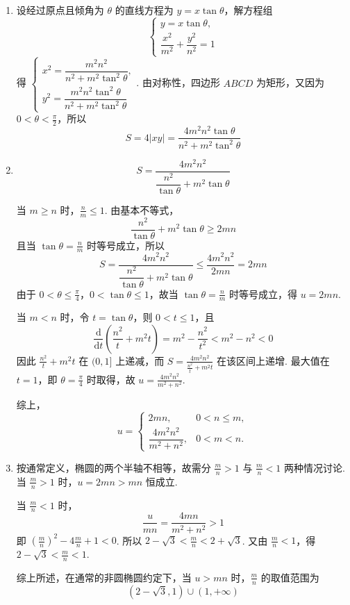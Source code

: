 \begin{solution}
\begin{enumerate}
\item 设经过原点且倾角为 \(\theta\) 的直线方程为 \(y=x\tan\theta\)，解方程组
\[
\begin{cases}
y=x\tan\theta,\\
\dfrac{x^2}{m^2}+\dfrac{y^2}{n^2}=1
\end{cases}
\]
得 \(\begin{cases}
x^2=\dfrac{m^2n^2}{n^2+m^2\tan^2\theta},\\
y^2=\dfrac{m^2n^2\tan^2\theta}{n^2+m^2\tan^2\theta}
\end{cases}\).
由对称性，四边形 \(ABCD\) 为矩形，又因为 \(0<\theta<\frac{\pi}{2}\)，所以
\[
S=4|xy|=\frac{4m^2n^2\tan\theta}{n^2+m^2\tan^2\theta}
\]

\item
\[
S=\frac{4m^2n^2}{\dfrac{n^2}{\tan\theta}+m^2\tan\theta}
\]

当 \(m\geqslant n\) 时，\(\frac{n}{m}\leqslant1\). 由基本不等式，
\[
\frac{n^2}{\tan\theta}+m^2\tan\theta\geqslant2mn
\]
且当 \(\tan\theta=\frac{n}{m}\) 时等号成立，所以
\[
S=\frac{4m^2n^2}{\dfrac{n^2}{\tan\theta}+m^2\tan\theta}\leqslant\frac{4m^2n^2}{2mn}=2mn
\]
由于 \(0<\theta\leqslant\frac{\pi}{4}\)，\(0<\tan\theta\leqslant1\)，故当 \(\tan\theta=\frac{n}{m}\) 时等号成立，得 \(u=2mn\).

当 \(m<n\) 时，令 \(t=\tan\theta\)，则 \(0<t\leqslant1\)，且
\[
\frac{\mathrm d}{\mathrm dt}\left(\frac{n^2}{t}+m^2t\right)=m^2-\frac{n^2}{t^2}<m^2-n^2<0
\]
因此 \(\frac{n^2}{t}+m^2t\) 在 \((0,1]\) 上递减，而 \(S=\frac{4m^2n^2}{\frac{n^2}{t}+m^2t}\) 在该区间上递增. 最大值在 \(t=1\)，即 \(\theta=\frac\pi4\) 时取得，故 \(u=\frac{4m^2n^2}{m^2+n^2}\).

综上，
\[
u=\begin{cases}
2mn,&0<n\leqslant m,\\
\dfrac{4m^2n^2}{m^2+n^2},&0<m<n.
\end{cases}
\]

\item 按通常定义，椭圆的两个半轴不相等，故需分 \(\frac{m}{n}>1\) 与 \(\frac{m}{n}<1\) 两种情况讨论. 当 \(\frac{m}{n}>1\) 时，\(u=2mn>mn\) 恒成立.

当 \(\frac{m}{n}<1\) 时，
\[
\frac{u}{mn}=\frac{4mn}{m^2+n^2}>1
\]
即 \(\left(\frac{m}{n}\right)^2-4\frac{m}{n}+1<0\).
所以 \(2-\sqrt{3}<\frac{m}{n}<2+\sqrt{3}\). 又由 \(\frac{m}{n}<1\)，得 \(2-\sqrt{3}<\frac{m}{n}<1\).

综上所述，在通常的非圆椭圆约定下，当 \(u>mn\) 时，\(\frac{m}{n}\) 的取值范围为
\[
\left(2-\sqrt{3},1\right)\cup\left(1,+\infty\right)
\]
\end{enumerate}
\end{solution}

